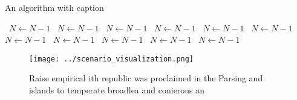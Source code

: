 \documentclass[a4paper]{article}
\begin{document}
\begin{algorithm}
\caption{An algorithm with caption}
\begin{algorithmic}
\    \State $N \gets N - 1$
\    \State $N \gets N - 1$
\    \State $N \gets N - 1$
\    \State $N \gets N - 1$
\    \State $N \gets N - 1$
\    \State $N \gets N - 1$
\    \State $N \gets N - 1$
\    \State $N \gets N - 1$
\    \State $N \gets N - 1$
\    \State $N \gets N - 1$
\    \State $N \gets N - 1$
\EndWhile
\end{algorithmic}
\end{algorithm}

\begin{figure}
\centering
\texttt{[image: ../scenario\_visualization.png]}
\caption{Raise empirical ith republic was proclaimed in the Parsing and islands to temperate broadlea and conierous an
}
\end{figure}
 
\end{document}
